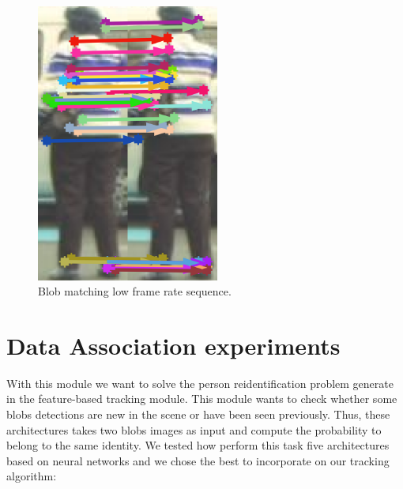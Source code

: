 \begin{figure}[H]
\centering         
\includegraphics[width=6cm]{lucasKanade/matchinBo.png}
\caption{Blob matching low frame rate sequence.} \label{fails2}
\end{figure}



\section{Data Association experiments}\label{exper:entrenar}



With this module we want to solve the person reidentification problem generate in the feature-based tracking module. This module wants to check whether some blobs detections are new in the scene or have been seen previously. Thus, these architectures takes two blobs images as input and compute the probability to belong to the same identity. We tested how perform this task five architectures based on neural networks and we chose the best to incorporate on our tracking algorithm: 



